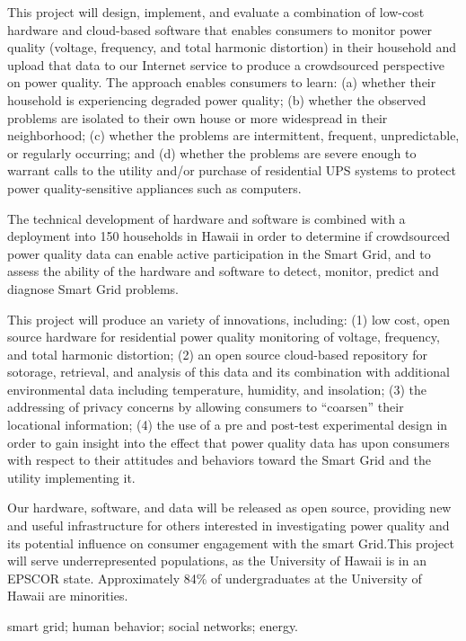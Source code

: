 This project will design, implement, and evaluate a combination of low-cost hardware and cloud-based software that enables consumers to monitor power quality (voltage, frequency, and total harmonic distortion) in their household and upload that data to our Internet service to produce a crowdsourced perspective on power quality.  The approach enables consumers to learn: (a) whether their household is experiencing degraded power quality; (b) whether the observed problems are isolated to their own house or more widespread in their neighborhood; (c) whether the problems are intermittent, frequent, unpredictable, or regularly occurring; and (d) whether the problems are severe enough to warrant calls to the utility and/or purchase of residential UPS systems to protect power quality-sensitive appliances such as computers.

The technical development of hardware and software is combined with a deployment into 150 households in Hawaii in order to determine if crowdsourced power quality data can enable active participation in the Smart Grid, and to assess the ability of the hardware and software to detect, monitor, predict and diagnose Smart Grid problems.

\medskip


This project will produce an variety of innovations, including: (1) low cost, open source hardware for residential power quality monitoring of voltage, frequency, and total harmonic distortion; (2) an open source cloud-based repository for sotorage, retrieval, and analysis of this data and its combination with additional environmental data including temperature, humidity, and insolation; (3) the addressing of privacy concerns by allowing consumers to ``coarsen'' their locational information; (4) the use of a pre and post-test experimental design in order to gain insight into the effect that power quality data has upon consumers with respect to their attitudes and behaviors toward the Smart Grid and the utility implementing it.


\medskip 


Our hardware, software, and data will be released as open source, providing new and useful infrastructure for others interested in investigating power quality and its potential influence on consumer engagement with the smart Grid.This project will serve underrepresented populations, as the University of Hawaii is in an EPSCOR state. Approximately 84\% of undergraduates at the University of Hawaii are minorities.

\medskip

 smart grid; human behavior; social networks;
energy.




